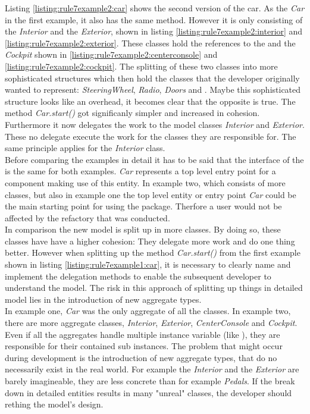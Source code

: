 Listing \ref{listing:rule7example2:car} shows the second version of the car. As the \textit{Car} in the first example, it also has the same method. However it is only consisting of the \textit{Interior} and the \textit{Exterior}, shown in listing \ref{listing:rule7example2:interior} and \ref{listing:rule7example2:exterior}. These classes hold the references to the  and the \textit{Cockpit} shown in \ref{listing:rule7example2:centerconsole} and \ref{listing:rule7example2:cockpit}. The splitting of these two classes into more sophisticated structures which then hold the classes that the developer originally wanted to represent: \textit{SteeringWheel}, \textit{Radio}, \textit{Doors} and . Maybe this sophisticated structure looks like an overhead,  it becomes clear that the opposite is true. The method \textit{Car.start()} got significanly simpler and increased in cohesion. Furthermore it now delegates the work to the model classes \textit{Interior} and \textit{Exterior}. These no delegate execute the work for the classes they are responsible for. The same principle applies for the \textit{Interior} class. 
\\

Before comparing the examples in detail it has to be said that the interface of the  is the same for both examples. \textit{Car} represents a top level entry point for a component making use of this entity. In example two, which consists of more classes, but also in example one the top level entity or entry point \textit{Car} could be the main starting point for using the package. Therfore a user would not be affected by the refactory that was conducted. 
\\

In comparison the new model is split up in more classes. By doing so, these classes have have a higher cohesion: They delegate more work and do one thing better. However when splitting up the method \textit{Car.start()} from the first example shown in listing \ref{listing:rule7example1:car}, it is necessary to clearly name and implement the delegation methods to enable the subsequent developer to understand the model. The risk in this approach of splitting up things in detailed model lies in the introduction of new aggregate types. 
\\

In example one, \textit{Car} was the only aggregate of all the classes. In example two, there are more aggregate classes, \textit{Interior}, \textit{Exterior}, \textit{CenterConsole} and \textit{Cockpit}. Even if all the aggregates handle multiple instance variable (like ), they are responsible for their contained sub instances. The problem that might occur during development is the introduction of new aggregate types, that do no necessarily exist in the real world. For example the \textit{Interior} and the \textit{Exterior} are barely imagineable, they are less concrete than for example \textit{Pedals}. If the break down in detailed entities results in many "unreal" classes, the developer should rething the model's design. 
\\

